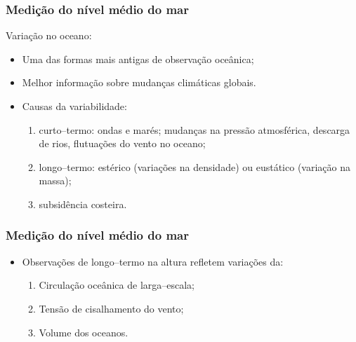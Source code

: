 \begin{frame}
\frametitle{Medição do nível médio do mar}
Variação no oceano:
    \small{
    \begin{itemize}[<+-| alert@+>]
    \item Uma das formas mais antigas de observação oceânica;
    \item Melhor informação sobre mudanças climáticas globais.
    \item Causas da variabilidade:
        \begin{enumerate}[<+-| alert@+>]
            \item curto--termo: ondas e marés; mudanças na pressão atmosférica,
                  descarga de rios, flutuações do vento no oceano;
            \item longo--termo: estérico (variações na densidade) ou eustático
                  (variação na massa);
            \item subsidência costeira.
        \end{enumerate}
    \end{itemize}
    }
\end{frame}

\begin{frame}
\frametitle{Medição do nível médio do mar}
    \small{
    \begin{itemize}
    \item Observações de longo--termo na altura refletem variações da:
        \begin{enumerate}[<+-| alert@+>]
            \item Circulação oceânica de larga–escala;
            \item Tensão de cisalhamento do vento;
            \item Volume dos oceanos.
        \end{enumerate}
    \end{itemize}
    }
\end{frame}

